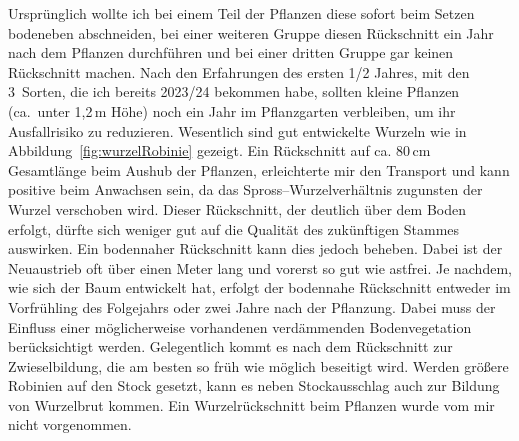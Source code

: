 \documentclass[twocolumn]{scrartcl}
\begin{document}
Ursprünglich wollte ich bei
einem Teil der Pflanzen diese sofort beim Setzen bodeneben
abschneiden, bei einer weiteren Gruppe diesen Rückschnitt ein Jahr
nach dem Pflanzen durchführen und bei einer dritten Gruppe gar keinen
Rückschnitt machen. Nach den Erfahrungen des ersten 1/2 Jahres, mit den
3~Sorten, die ich bereits 2023/24 bekommen habe, sollten kleine
Pflanzen (ca.\ unter 1,2\,m Höhe) noch ein Jahr im Pflanzgarten
verbleiben, um ihr Ausfallrisiko zu reduzieren. Wesentlich sind gut
entwickelte Wurzeln wie in Abbildung~\ref{fig:wurzelRobinie} gezeigt.
Ein Rückschnitt auf ca. 80\,cm Gesamtlänge beim Aushub der Pflanzen, erleichterte mir
den Transport und kann positive beim Anwachsen sein, da das
Spross--Wurzelverhältnis zugunsten der Wurzel verschoben wird.
Dieser Rückschnitt, der deutlich über dem Boden erfolgt, dürfte sich weniger gut auf die Qualität des zukünftigen Stammes auswirken.
Ein bodennaher Rückschnitt kann dies jedoch beheben. Dabei ist der Neuaustrieb oft über einen Meter lang und vorerst so gut wie astfrei.
Je nachdem, wie sich der Baum entwickelt hat, erfolgt der bodennahe Rückschnitt entweder im Vorfrühling des Folgejahrs oder zwei Jahre nach der Pflanzung.
Dabei muss der Einfluss einer möglicherweise vorhandenen
verdämmenden Bodenvegetation berücksichtigt werden. Gelegentlich kommt
es nach dem Rückschnitt zur Zwieselbildung, die am besten so früh wie
möglich beseitigt wird. Werden größere Robinien auf den Stock gesetzt,
kann es neben Stockausschlag auch zur Bildung von Wurzelbrut
kommen. Ein Wurzelrückschnitt beim Pflanzen wurde vom mir nicht vorgenommen.
\end{document}
